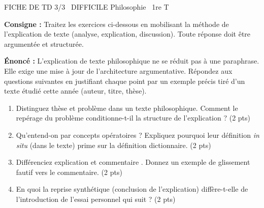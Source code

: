 \documentclass[11pt]{article}
\begin{document}
\begin{tcolorbox}[enhanced,colback=popink,colframe=popink,arc=10pt,boxrule=0pt,left=12pt,right=12pt,top=9pt,bottom=9pt]
{\color{white}\popxbold\small FICHE DE TD 3/3 \textbullet\ DIFFICILE \hfill Philosophie \textbullet\ 1re T\par}
\end{tcolorbox}
\vspace{4pt}
\noindent \textbf{Consigne :} Traitez les exercices ci-dessous en mobilisant la méthode de l'explication de texte (analyse, explication, discussion). Toute réponse doit être argumentée et structurée.

\begin{exercice}
\textbf{Énoncé :} L'explication de texte philosophique ne se réduit pas à une paraphrase. Elle exige une mise à jour de l'architecture argumentative. Répondez aux questions suivantes en justifiant chaque point par un exemple précis tiré d'un texte étudié cette année (auteur, titre, thèse).
\begin{enumerate}
    \item Distinguez \og thèse \fg{} et \og problème \fg{} dans un texte philosophique. Comment le repérage du problème conditionne-t-il la structure de l'explication ? \hfill (2 pts)
    \item Qu'entend-on par \og concepts opératoires \fg{} ? Expliquez pourquoi leur définition \textit{in situ} (dans le texte) prime sur la définition dictionnaire. \hfill (2 pts)
    \item Différenciez \og explication \fg{} et \og commentaire \fg{}. Donnez un exemple de glissement fautif vers le commentaire. \hfill (2 pts)
    \item En quoi la \og reprise synthétique \fg{} (conclusion de l'explication) diffère-t-elle de l'introduction de l'essai personnel qui suit ? \hfill (2 pts)
\end{enumerate}
\end{exercice}
\end{document}
